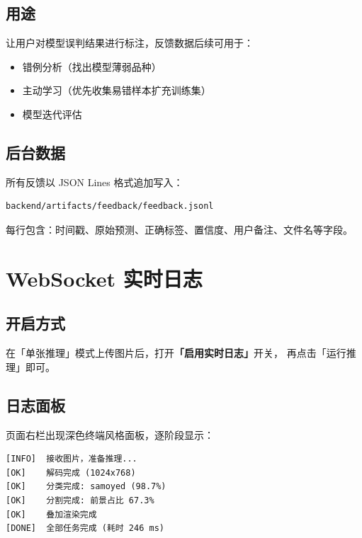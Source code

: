 \documentclass[12pt, a4paper, openany]{ctexbook}
\begin{document}
\subsection{用途}

让用户对模型误判结果进行标注，反馈数据后续可用于：

\begin{itemize}
  \item 错例分析（找出模型薄弱品种）
  \item 主动学习（优先收集易错样本扩充训练集）
  \item 模型迭代评估
\end{itemize}

\subsection{后台数据}

所有反馈以 JSON Lines 格式追加写入：

\begin{lstlisting}
backend/artifacts/feedback/feedback.jsonl
\end{lstlisting}

每行包含：时间戳、原始预测、正确标签、置信度、用户备注、文件名等字段。

\section{WebSocket 实时日志}

\subsection{开启方式}

在「单张推理」模式上传图片后，打开\textbf{「启用实时日志」}开关，
再点击「运行推理」即可。

\subsection{日志面板}

页面右栏出现深色终端风格面板，逐阶段显示：

\begin{lstlisting}
[INFO]  接收图片，准备推理...
[OK]    解码完成 (1024x768)
[OK]    分类完成: samoyed (98.7%)
[OK]    分割完成: 前景占比 67.3%
[OK]    叠加渲染完成
[DONE]  全部任务完成 (耗时 246 ms)
\end{lstlisting}

\end{document}
